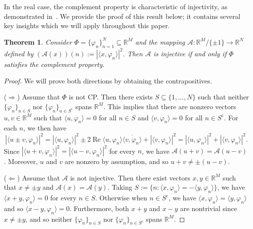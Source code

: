 \documentclass[times,10pt]{elsarticle}
\theoremstyle{plain}
\newtheorem{theorem}{Theorem}
\begin{document}
In the real case, the complement property is characteristic of injectivity, as demonstrated in~\cite{BalanCE:06}.
We provide the proof of this result below; it contains several key insights which we will apply throughout this paper.

\begin{theorem}
\label{thm.complement property characterization}
Consider $\Phi=\{\varphi_n\}_{n=1}^N\subseteq\mathbb{R}^M$ and the mapping $\mathcal{A}\colon\mathbb{R}^M/\{\pm1\}\rightarrow\mathbb{R}^N$ defined by $(\mathcal{A}(x))(n):=|\langle x,\varphi_n\rangle|^2$. 
Then $\mathcal{A}$ is injective if and only if $\Phi$ satisfies the complement property.
\end{theorem}

\begin{proof}
We will prove both directions by obtaining the contrapositives.

($\Rightarrow$) 
Assume that $\Phi$ is not CP. 
Then there exists $S\subseteq\{1,\ldots,N\}$ such that neither $\{\varphi_n\}_{n\in S}$ nor $\{\varphi_n\}_{n\in S^\mathrm{c}}$ spans $\mathbb{R}^M$. 
This implies that there are nonzero vectors $u,v\in\mathbb{R}^M$ such that $\langle u,\varphi_n\rangle=0$ for all $n\in S$ and $\langle v,\varphi_n\rangle=0$ for all $n\in S^\mathrm{c}$.
For each $n$, we then have
\begin{equation*}
|\langle u\pm v,\varphi_n\rangle|^2
=|\langle u,\varphi_n\rangle|^2\pm2\operatorname{Re}\langle u,\varphi_n\rangle\overline{\langle v,\varphi_n\rangle}+|\langle v,\varphi_n\rangle|^2
=|\langle u,\varphi_n\rangle|^2+|\langle v,\varphi_n\rangle|^2.
\end{equation*}
Since $|\langle u+v,\varphi_n\rangle|^2=|\langle u-v,\varphi_n\rangle|^2$ for every $n$, we have $\mathcal{A}(u+v)=\mathcal{A}(u-v)$. 
Moreover, $u$ and $v$ are nonzero by assumption, and so $u+v\neq\pm(u-v)$.

($\Leftarrow$) 
Assume that $\mathcal{A}$ is not injective. 
Then there exist vectors $x,y\in\mathbb{R}^M$ such that $x\neq\pm y$ and $\mathcal{A}(x)=\mathcal{A}(y)$. 
Taking $S:=\{n:\langle x,\varphi_n\rangle=-\langle y,\varphi_n\rangle\}$, we have $\langle x+y,\varphi_n\rangle=0$ for every $n\in S$.
Otherwise when $n\in S^\mathrm{c}$, we have $\langle x,\varphi_n\rangle=\langle y,\varphi_n\rangle$ and so $\langle x-y,\varphi_n\rangle=0$.
Furthermore, both $x+y$ and $x-y$ are nontrivial since $x\neq\pm y$, and so neither $\{\varphi_n\}_{n\in S}$ nor $\{\varphi_n\}_{n\in S^\mathrm{c}}$ spans $\mathbb{R}^M$.
\qquad
\end{proof}
\end{document}
